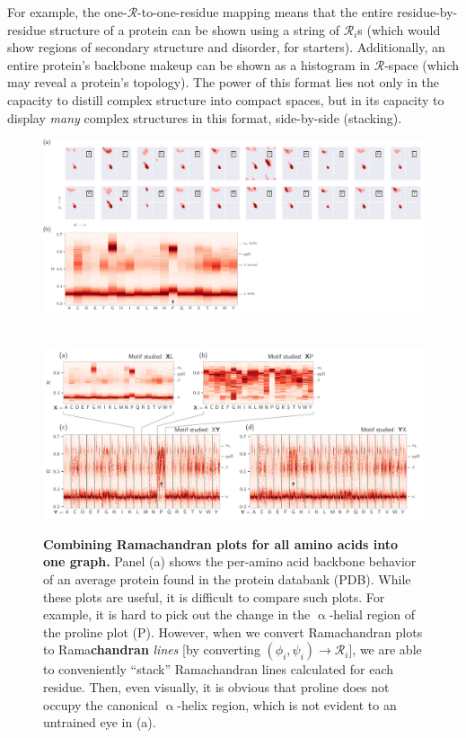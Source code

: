 \documentclass[fleqn,10pt,lineno]{wlpeerj} %
\newcommand{\n}[1]{{\textbf{\color{red}#1}}}
\begin{document}
For example, the one-$\mathcal{R}$-to-one-residue mapping means that the entire residue-by-residue structure of a protein can be shown using a string of $\mathcal{R}_i$s (which would show regions of secondary structure and disorder, for starters). Additionally, an entire protein's backbone makeup can be shown as a histogram in $\mathcal{R}$-space (which may reveal a protein's topology). The power of this format lies not only in the capacity to distill complex structure into compact spaces, but in its capacity to display {\it many} complex structures in this format, side-by-side (stacking).

\begin{figure}
\begin{adjustwidth}{-1in}{0in} %
\centering
\includegraphics[width=1.00\linewidth]{backmap_fig7.pdf}
\caption{\textbf{\n{Combining Ramachandran plots for all amino acids into one graph.}}  
Panel (a) shows the per-amino acid backbone behavior of an average protein found in the protein databank (PDB). While these plots are useful, it is difficult to compare such plots. For example, it is hard to pick out the change in the $\upalpha$-helial region of the proline plot (P). However, when we convert Ramachandran plots to Rama\n{chandran} \textit{lines} [by converting $(\phi_i,\psi_i)\to\mathcal{R}_i$], we are able to conveniently ``stack'' Ramachandran lines calculated for each residue. Then, even visually, it is obvious that proline does not occupy the canonical $\upalpha$-helix region, which is not evident to an untrained eye in (a).\label{fig:peraa}}
~\vfill~
\includegraphics[width=1.00\linewidth]{backmap_fig8.pdf}

\end{adjustwidth}
\end{figure}
\end{document}
